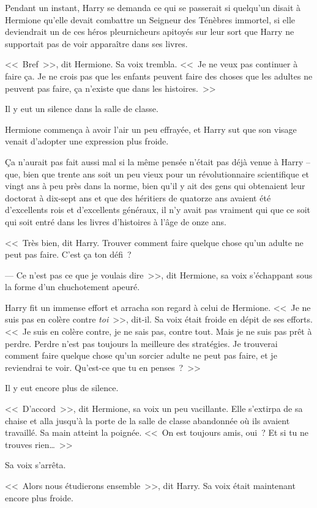 Pendant un instant, Harry se demanda ce qui se passerait si quelqu'un disait à Hermione qu'elle devait combattre un Seigneur des Ténèbres immortel, si elle deviendrait un de ces héros pleurnicheurs apitoyés sur leur sort que Harry ne supportait pas de voir apparaître dans ses livres.

<<~Bref~>>, dit Hermione. Sa voix trembla. <<~Je ne veux pas continuer à faire ça. Je ne crois pas que les enfants peuvent faire des choses que les adultes ne peuvent pas faire, ça n'existe que dans les histoires.~>>

Il y eut un silence dans la salle de classe.

Hermione commença à avoir l'air un peu effrayée, et Harry sut que son visage venait d'adopter une expression plus froide.

Ça n'aurait pas fait aussi mal si la même pensée n'était pas déjà venue à Harry -- que, bien que trente ans soit un peu vieux pour un révolutionnaire scientifique et vingt ans à peu près dans la norme, bien qu'il y ait des gens qui obtenaient leur doctorat à dix-sept ans et que des héritiers de quatorze ans avaient été d'excellents rois et d'excellents généraux, il n'y avait pas vraiment qui que ce soit qui soit entré dans les livres d'histoires à l'âge de onze ans.

<<~Très bien, dit Harry. Trouver comment faire quelque chose qu'un adulte ne peut pas faire. C'est ça ton défi~?

--- Ce n'est pas ce que je voulais dire~>>, dit Hermione, sa voix s'échappant sous la forme d'un chuchotement apeuré.

Harry fit un immense effort et arracha son regard à celui de Hermione. <<~Je ne suis pas en colère contre \emph{toi}~>>, dit-il. Sa voix était froide en dépit de ses efforts. <<~Je suis en colère contre, je ne sais pas, contre tout. Mais je ne suis pas prêt à perdre. Perdre n'est pas toujours la meilleure des stratégies. Je trouverai comment faire quelque chose qu'un sorcier adulte ne peut pas faire, et je reviendrai te voir. Qu'est-ce que tu en penses~?~>>

Il y eut encore plus de silence.

<<~D'accord~>>, dit Hermione, sa voix un peu vacillante. Elle s'extirpa de sa chaise et alla jusqu'à la porte de la salle de classe abandonnée où ils avaient travaillé. Sa main atteint la poignée. <<~On est toujours amis, oui~? Et si tu ne trouves rien…~>>

Sa voix s'arrêta.

<<~Alors nous étudierons ensemble~>>, dit Harry. Sa voix était maintenant encore plus froide.

